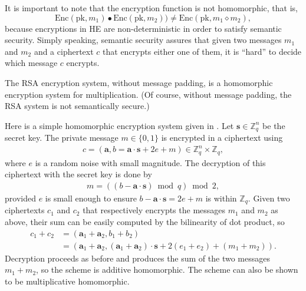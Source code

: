 \documentclass[../main.tex]{subfiles}
\begin{document}
It is important to note that the encryption function is not homomorphic, that is,  
\begin{equation*}
    \text{Enc}(\text{pk},m_1) \bullet \text{Enc}(\text{pk},m_2)) \neq \text{Enc}(\text{pk},m_1 \diamond m_2),
\end{equation*}
because encryptions in HE are non-deterministic 
in order to satisfy semantic security. Simply speaking, semantic security assures that given two messages $m_1$ and $m_2$ and a ciphertext $c$ that encrypts either one of them, it is ``hard'' to decide which message $c$ encrypts. 


\begin{example}
The RSA encryption system, without message padding, is a homomorphic encryption system for multiplication. (Of course, without message padding, the RSA system is not semantically secure.)
\end{example}

\begin{example}
Here is a simple homomorphic encryption system given in \cite{brakerski2014efficient}.  
Let $\mathbf{s} \in \mathbb{Z}_q^n$ be the secret key. The private message $m \in \{0,1\}$ is encrypted in a ciphertext using 
\begin{align*}
    c = (\mathbf{a}, b=\mathbf{a} \cdot \mathbf{s} + 2 e + m) \in \mathbb{Z}_q^n \times \mathbb{Z}_q,
\end{align*}
where $e$ is a random noise with small magnitude. The decryption of this ciphertext with the secret key is done by 
\begin{align*}
    m = ((b - \mathbf{a} \cdot \mathbf{s}) \bmod q) \bmod 2,
\end{align*}
provided $e$ is small enough to ensure $b - \mathbf{a} \cdot \mathbf{s} = 2e+m$ is within $\mathbb{Z}_q$. 
%
Given two ciphertexts $c_1$ and $c_2$ that respectively encrypts the messages $m_1$ and $m_2$ as above, their sum can be easily computed by the bilinearity of dot product, so
\begin{align*}
    c_1+c_2&=(\mathbf{a}_1+\mathbf{a}_2,b_1+b_2)\\
    &=(\mathbf{a}_1+\mathbf{a}_2,(\mathbf{a}_1+\mathbf{a}_2)\cdot \mathbf{s} + 2(e_1+e_2) + (m_1+m_2)).
\end{align*}
Decryption proceeds as before and produces the sum of the two messages $m_1+m_2$, so the scheme is additive homomorphic. The scheme can also be shown to be multiplicative homomorphic. %
\end{example}
\end{document}
